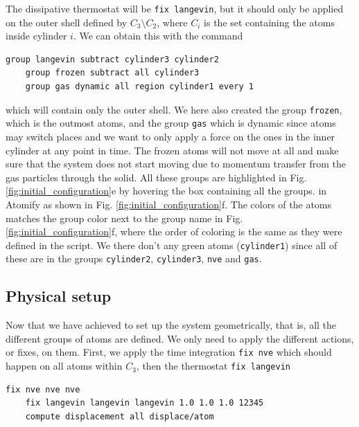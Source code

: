 \documentclass[aps,pre,twocolumn,letterpaper,floatfix,nofootinbib]{revtex4}
\newcommand{\code}[1]{\colorbox{light-gray}{\color{RawSienna}\texttt{#1}}}
\begin{document}
The dissipative thermostat will be \code{fix langevin}\citep{schneider1978molecular}, but it should only be applied on the outer shell defined by $C_3 \setminus C_2$,
where $C_i$ is the set containing the atoms inside cylinder $i$.
We can obtain this with the command

\begin{lstlisting}[basicstyle=\tiny, frame = none, numbers=none, framexleftmargin=0pt, xleftmargin=-0.75cm, xrightmargin=0.0cm]
	group langevin subtract cylinder3 cylinder2
	group frozen subtract all cylinder3
	group gas dynamic all region cylinder1 every 1
\end{lstlisting}

which will contain only the outer shell. 
We here also created the group \code{frozen}, which is the outmost atoms, and the group \code{gas} which is dynamic since atoms may switch places and we want to only apply a force on the ones in the inner cylinder at any point in time.
The frozen atoms will not move at all and make sure that the system does not start moving due to momentum transfer from the gas particles through the solid.
All these groups are highlighted in Fig. \ref{fig:initial_configuration}e by hovering the box containing all the groups. in Atomify as shown in Fig. \ref{fig:initial_configuration}f.
The colors of the atoms matches the group color next to the group name in Fig. \ref{fig:initial_configuration}f, where the order of coloring is the same as they were defined in the script.
We there don't any green atoms (\code{cylinder1}) since all of these are in the groups \code{cylinder2}, \code{cylinder3}, \code{nve} and \code{gas}.

\subsection{Physical setup}
Now that we have achieved to set up the system geometrically, that is, all the different groups of atoms are defined.
We only need to apply the different actions, or fixes, on them.
First, we apply the time integration \code{fix nve} which should happen on all atoms within $C_3$, then the thermostat \code{fix langevin}

\begin{lstlisting}[basicstyle=\tiny, frame = none, numbers=none, framexleftmargin=0pt, xleftmargin=-0.75cm, xrightmargin=0.0cm]
	fix nve nve nve
	fix langevin langevin langevin 1.0 1.0 1.0 12345
	compute displacement all displace/atom
\end{lstlisting}
\end{document}
